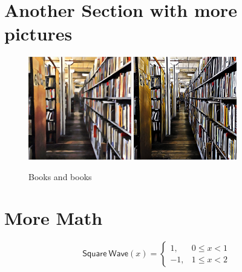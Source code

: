 \documentclass[10pt,letterpaper,twoside,final]{memoir}
\begin{document}
\lipsum[10-11]

\section{Another Section with more pictures}

\lipsum[12-13]

\begin{figure}
\centering
\includegraphics[width=0.4\textwidth]{BooksPic1}
\qquad
\includegraphics[width=0.4\textwidth]{BooksPic2}
\caption{\label{fig:path}Books and books}
\end{figure}

\lipsum[13-14]

\section{More Math}

\lipsum[15-16]

\[
\mathsf{Square\ Wave}(x) = \left\{ 
      \begin{array}{ll} 1, & 0 \leq x < 1 \\ 
                       -1, & 1 \leq x < 2 \end{array} \right.
\]
\end{document}
